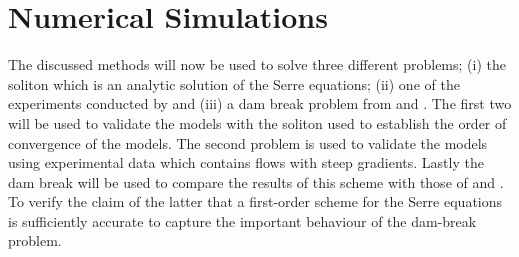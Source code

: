 \documentclass[SingleSpace,12pt]{Serre_ASCE}
\begin{document}
\section{Numerical Simulations}
\label{section:Numerical Simulations}
The discussed methods will now be used to solve three different problems; (i) the soliton which is an analytic solution of the Serre equations; (ii) one of the experiments conducted by  and (iii) a dam break problem from   and . The first two will be used to validate the models with the soliton used to establish the order of convergence of the models. The second problem is used to validate the models using experimental data which contains flows with steep gradients. Lastly the dam break will be used to compare the results of this scheme with those of  and . To verify the claim of the latter that a first-order scheme for the Serre equations is sufficiently accurate to capture the important behaviour of the dam-break problem. 
\end{document}
